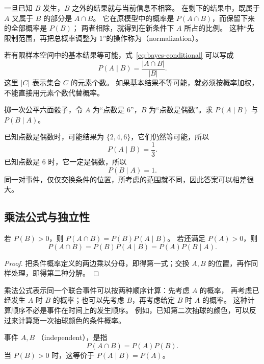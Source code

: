 \documentclass[UTF8]{ctexart}
\begin{document}
一旦已知 $B$ 发生，$B$ 之外的结果就与当前信息不相容。
在剩下的结果中，既属于 $A$ 又属于 $B$ 的部分是 $A\cap B$。
它在原模型中的概率是 $P(A\cap B)$，而保留下来的全部概率是 $P(B)$；
两者相除，就得到在新条件下 $A$ 所占的比例。
这种“先限制范围，再把总概率调整为 $1$”的操作称为（normalization）。

若有限样本空间中的基本结果等可能，式~\eqref{eq:bayes-conditional} 可以写成
\[
  P(A\mid B)=\frac{|A\cap B|}{|B|}.
\]
这里 $|C|$ 表示集合 $C$ 的元素个数。
如果基本结果不等可能，就必须按概率加权，不能直接用元素个数代替概率。

\begin{example}[两个方向的条件概率]
\label{ex:bayes-die}
掷一次公平六面骰子，令 $A$ 为“点数是 $6$”，$B$ 为“点数是偶数”。求 $P(A\mid B)$ 与 $P(B\mid A)$。
\end{example}
\begin{solve}
已知点数是偶数时，可能结果为 $\{2,4,6\}$，它们仍然等可能，所以
\[
  P(A\mid B)=\frac13.
\]
已知点数是 $6$ 时，它一定是偶数，所以
\[
  P(B\mid A)=1.
\]
同一对事件，仅仅交换条件的位置，所考虑的范围就不同，因此答案可以相差很大。
\end{solve}

\subsection{乘法公式与独立性}

\begin{proposition}[两个事件的乘法公式]
\label{prop:bayes-product}
若 $P(B)>0$，则 $P(A\cap B)=P(B)P(A\mid B)$。
若还满足 $P(A)>0$，则
\begin{equation}
  P(A\cap B)=P(B)P(A\mid B)=P(A)P(B\mid A).
  \label{eq:bayes-product}
\end{equation}
\end{proposition}
\begin{proof}
把条件概率定义的两边乘以分母，即得第一式；交换 $A,B$ 的位置，再作同样处理，即得第二种分解。
\end{proof}

乘法公式表示同一个联合事件可以按两种顺序计算：先考虑 $A$ 的概率，
再考虑已经发生 $A$ 时 $B$ 的概率；也可以先考虑 $B$，再考虑给定 $B$ 时 $A$ 的概率。
这种计算顺序不必是事件在时间上的发生顺序。
例如，已知第二次抽球的颜色，可以反过来计算第一次抽球颜色的条件概率。

\begin{definition}[事件的独立性]
事件 $A,B$ （independent），是指
\[
  P(A\cap B)=P(A)P(B).
\]
当 $P(B)>0$ 时，这等价于 $P(A\mid B)=P(A)$。
\end{definition}
\end{document}
